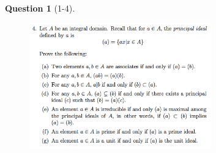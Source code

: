 \documentclass[11pt]{article}
\theoremstyle{plain}
\theoremstyle{quest}
\newtheorem*{question}{Question}
\begin{document}
\begin{question}[1-4]
\hfill
\begin{figure}[h!]
  \centering
    \includegraphics[width=0.7\textwidth]{ANT-s1-p4.png}
\end{figure}
\end{question}
\end{document}
